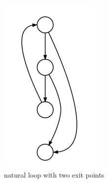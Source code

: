 \begin{figure}[h]
\begin{subfigure}[t]{.24\textwidth}
	\includegraphics[width=\linewidth]{cfgc.png}
	\caption{natural loop with two exit points}\label{fig:cfgc}		
	\end{subfigure}
	\begin{subfigure}[t]{.24\textwidth}
	\centering

\end{subfigure}
\end{figure}
